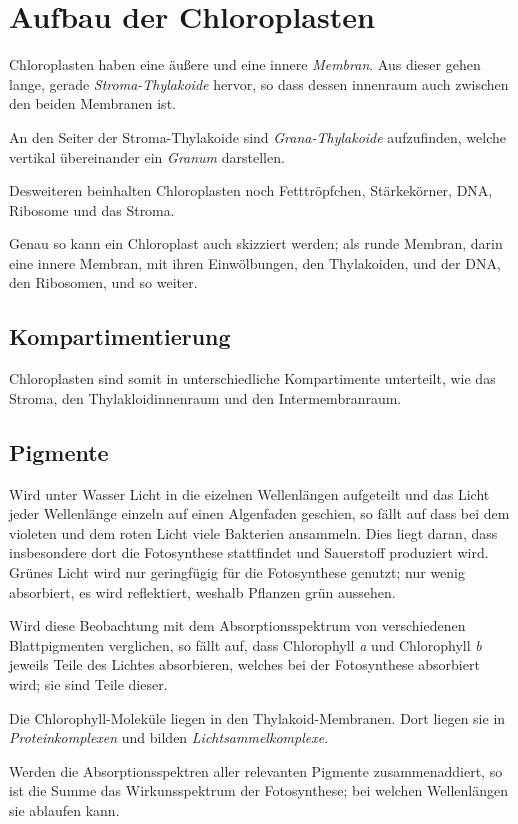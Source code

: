 \documentclass{article}
\begin{document}
\section{Aufbau der Chloroplasten} 
Chloroplasten haben eine äußere und eine innere \emph{Membran}. Aus dieser gehen lange, gerade \emph{Stroma-Thylakoide} hervor, so dass dessen innenraum auch zwischen den beiden Membranen ist.
 
An den Seiter der Stroma-Thylakoide sind \emph{Grana-Thylakoide} aufzufinden, welche vertikal übereinander ein \emph{Granum} darstellen.
 
Desweiteren beinhalten Chloroplasten noch Fetttröpfchen, Stärkekörner, DNA, Ribosome und das Stroma.

Genau so kann ein Chloroplast auch skizziert werden; als runde Membran, darin eine innere Membran, mit ihren Einwölbungen, den Thylakoiden, und der DNA, den Ribosomen, und so weiter.
 
\subsection{Kompartimentierung} 
Chloroplasten sind somit in unterschiedliche Kompartimente unterteilt, wie das Stroma, den Thylakloidinnenraum und den Intermembranraum. 
 
\subsection{Pigmente}
Wird unter Wasser Licht in die eizelnen Wellenlängen aufgeteilt und das Licht jeder Wellenlänge einzeln auf einen Algenfaden geschien, so fällt auf dass bei dem violeten und dem roten Licht viele Bakterien ansammeln. Dies liegt daran, dass insbesondere dort die Fotosynthese stattfindet und Sauerstoff produziert wird. Grünes Licht wird nur geringfügig für die Fotosynthese genutzt; nur wenig absorbiert, es wird reflektiert, weshalb Pflanzen grün aussehen.

Wird diese Beobachtung mit dem Absorptionsspektrum von verschiedenen Blattpigmenten verglichen, so fällt auf, dass Chlorophyll \textit{a} und Chlorophyll \textit{b} jeweils Teile des Lichtes absorbieren, welches bei der Fotosynthese absorbiert wird; sie sind Teile dieser.
 
Die Chlorophyll-Moleküle liegen in den Thylakoid-Membranen. Dort liegen sie in \emph{Proteinkomplexen} und bilden \emph{Lichtsammelkomplexe}. 

Werden die Absorptionsspektren aller relevanten Pigmente zusammenaddiert, so ist die Summe das Wirkunsspektrum der Fotosynthese; bei welchen Wellenlängen sie ablaufen kann.
\end{document}
